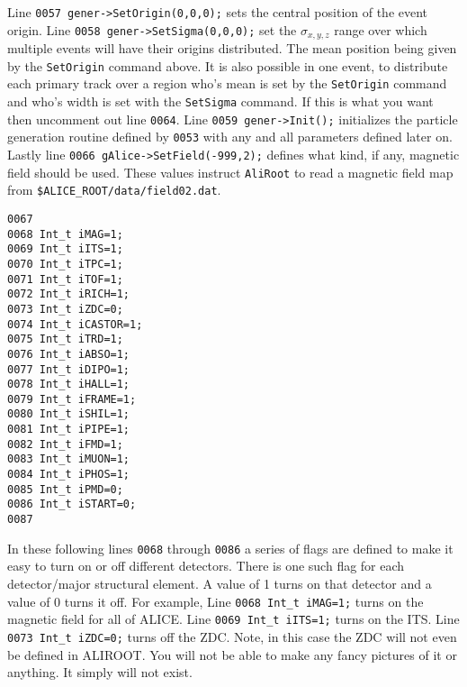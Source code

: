 Line \texttt{0057 gener->SetOrigin(0,0,0);} sets the central position of the
event origin. Line \texttt{0058 gener->SetSigma(0,0,0);} set the
$\sigma_{x,y,z}$ range over which multiple events will have their origins
distributed. The mean position being given by the \texttt{SetOrigin} command
above. It is also possible in one event, to distribute each primary track over
a region who's mean is set by the \texttt{SetOrigin} command and who's width is
set with the \texttt{SetSigma} command. If this is what you want then uncomment
out line \texttt{0064}. Line \texttt{0059 gener->Init();} initializes the
particle generation routine defined by \texttt{0053} with any and all
parameters defined later on. Lastly line \texttt{0066
gAlice->SetField(-999,2);} defines what kind, if any, magnetic field should be
used. These values instruct \texttt{AliRoot} to read a magnetic field map from
\texttt{\$ALICE\_ROOT/data/field02.dat}.

\scriptsize
\begin{verbatim}
0067 
0068 Int_t iMAG=1;
0069 Int_t iITS=1;
0070 Int_t iTPC=1;
0071 Int_t iTOF=1;
0072 Int_t iRICH=1;
0073 Int_t iZDC=0;
0074 Int_t iCASTOR=1;
0075 Int_t iTRD=1;
0076 Int_t iABSO=1;
0077 Int_t iDIPO=1;
0078 Int_t iHALL=1;
0079 Int_t iFRAME=1;
0080 Int_t iSHIL=1;
0081 Int_t iPIPE=1;
0082 Int_t iFMD=1;
0083 Int_t iMUON=1;
0084 Int_t iPHOS=1;
0085 Int_t iPMD=0;
0086 Int_t iSTART=0;
0087 
\end{verbatim}
\normalsize

In these following lines \texttt{0068} through \texttt{0086} a series of flags
are defined to make it easy to turn on or off different detectors. There is one
such flag for each detector/major structural element. A value of 1 turns on
that detector and a value of 0 turns it off. For example, Line 
\texttt{0068 Int\_t iMAG=1;} turns on the magnetic field for all of 
ALICE\footnotemark. Line \texttt{0069 Int\_t iITS=1;} turns on the ITS. Line
\texttt{0073 Int\_t iZDC=0;} turns off the ZDC\footnotemark. Note, in this
case the ZDC will not even be defined in ALIROOT. You will not be able to make
any fancy pictures of it or anything. It simply will not exist.

\addtocounter{footnote}{-1}

\addtocounter{footnote}{1}

